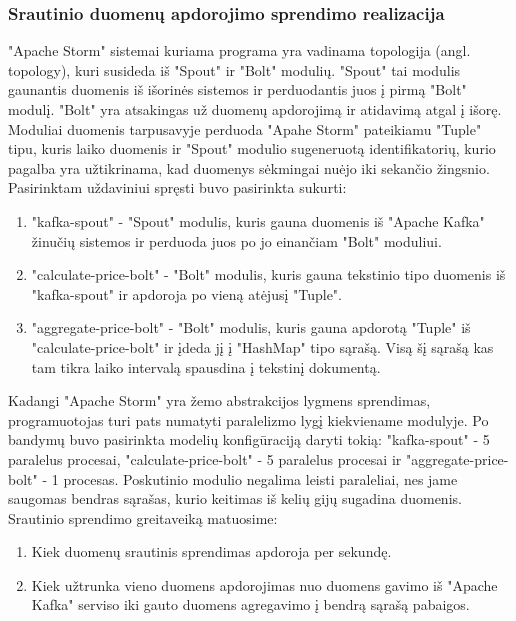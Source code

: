 \documentclass{VUMIFPSkursinis}
\begin{document}
\subsubsection{Srautinio duomenų apdorojimo sprendimo realizacija}

"Apache Storm" sistemai kuriama programa yra vadinama topologija (angl. topology), kuri susideda iš "Spout" ir "Bolt" modulių. "Spout" tai modulis gaunantis duomenis
iš išorinės sistemos ir perduodantis juos į pirmą "Bolt" modulį. "Bolt" yra atsakingas už duomenų apdorojimą ir atidavimą atgal į išorę.
Moduliai duomenis tarpusavyje perduoda "Apahe Storm" pateikiamu "Tuple" tipu, kuris laiko duomenis ir "Spout" modulio sugeneruotą identifikatorių, 
kurio pagalba yra užtikrinama, kad duomenys sėkmingai nuėjo iki sekančio žingsnio. 
Pasirinktam uždaviniui spręsti buvo pasirinkta sukurti:
\begin{enumerate}
    \item "kafka-spout" - "Spout" modulis, kuris gauna duomenis iš "Apache Kafka" žinučių sistemos ir perduoda juos po jo einančiam "Bolt" moduliui.
    \item "calculate-price-bolt" - "Bolt" modulis, kuris gauna tekstinio tipo duomenis iš "kafka-spout" ir apdoroja po vieną atėjusį "Tuple".
    \item "aggregate-price-bolt" - "Bolt" modulis, kuris gauna apdorotą "Tuple" iš "calculate-price-bolt" ir įdeda jį į "HashMap" tipo sąrašą. 
    Visą šį sąrašą kas tam tikra laiko intervalą spausdina į tekstinį dokumentą.  
\end{enumerate}\par
Kadangi "Apache Storm" yra žemo abstrakcijos lygmens sprendimas, programuotojas turi pats numatyti paralelizmo lygį kiekviename modulyje. 
Po bandymų buvo pasirinkta modelių konfigūraciją daryti tokią: "kafka-spout" - 5 paralelus procesai, "calculate-price-bolt"
 - 5 paralelus procesai ir "aggregate-price-bolt" - 1 procesas. Poskutinio modulio negalima leisti paraleliai, nes jame saugomas bendras sąrašas,
kurio keitimas iš kelių gijų sugadina duomenis. Srautinio sprendimo greitaveiką matuosime:
\begin{enumerate}
    \item Kiek duomenų srautinis sprendimas apdoroja per sekundę.
    \item Kiek užtrunka vieno duomens apdorojimas nuo duomens gavimo iš "Apache Kafka" serviso iki gauto duomens agregavimo į bendrą sąrašą pabaigos.
\end{enumerate}
\end{document}
